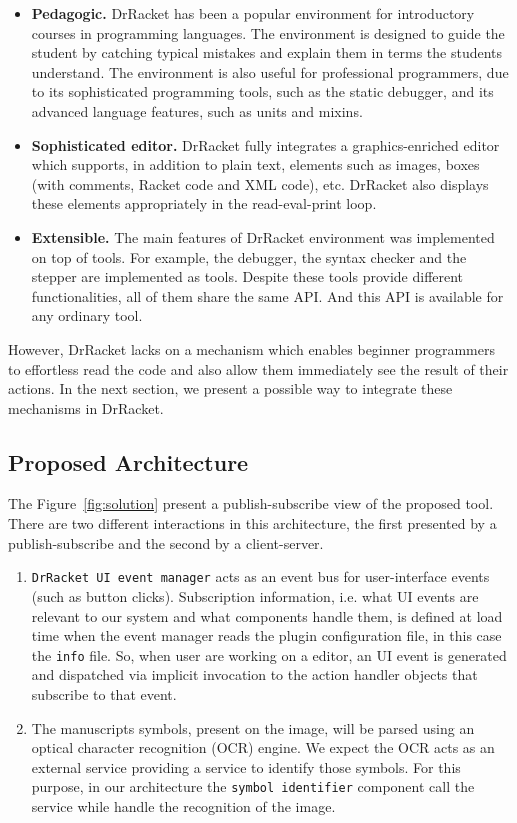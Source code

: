 \begin{itemize}
	\item \textbf{Pedagogic.} DrRacket has been a popular environment for introductory courses in programming languages. The environment is designed to guide the student by catching typical mistakes and explain them in terms the students understand. The environment is also useful for professional programmers, due to its sophisticated programming tools, such as the static debugger, and its advanced language features, such as units and mixins.

	\item \textbf{Sophisticated editor.} DrRacket fully integrates a graphics-enriched editor which supports, in addition to plain text, elements such as images, boxes (with comments, Racket code and XML code), etc. DrRacket also displays these elements appropriately in the read-eval-print loop.

	\item \textbf{Extensible.} The main features of DrRacket environment was implemented on top of tools. For example, the debugger, the syntax checker and the stepper are implemented as tools. Despite these tools provide different functionalities, all of them share the same API. And this API is available for any ordinary tool.
\end{itemize}

However, DrRacket lacks on a mechanism which enables beginner programmers to effortless read the code and also allow them immediately see the result of their actions. In the next section, we present a possible way to integrate these mechanisms in DrRacket.

\subsection{Proposed Architecture}

The Figure~\ref{fig:solution} present a publish-subscribe view of the proposed tool. There are two different interactions in this architecture, the first presented by a publish-subscribe and the second by a client-server.

\begin{enumerate}
	\item \texttt{DrRacket UI event manager} acts as an event bus for user-interface events (such as button clicks). Subscription information, i.e. what UI events are relevant to our system and what components handle them, is defined at load time when the event manager reads the plugin configuration file, in this case the \texttt{info} file. So, when user are working on a editor, an UI event is generated and dispatched via implicit invocation to the action handler objects that subscribe to that event.

	\item The manuscripts symbols, present on the image, will be parsed using an optical character recognition (OCR) engine. We expect the OCR acts as an external service providing a service to identify those symbols. For this purpose, in our architecture the \texttt{symbol identifier} component call the service while handle the recognition of the image.
\end{enumerate}

